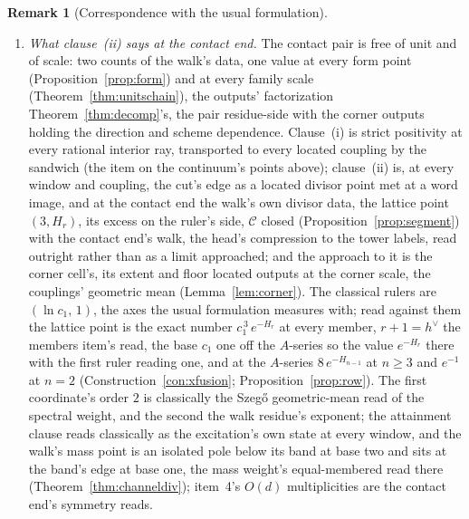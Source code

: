 \documentclass[11pt]{article}
\theoremstyle{definition}
\newtheorem{remark}{Remark}
\begin{document}
\begin{remark}[Correspondence with the usual formulation]
\begin{enumerate}[leftmargin=2em,itemsep=3pt]
\item \emph{What clause~(ii) says at the contact end.} The contact
pair is free of unit and of scale: two counts of the walk's data,
one value at every form point (Proposition~\ref{prop:form}) and at
every family scale (Theorem~\ref{thm:unitschain}), the outputs'
factorization Theorem~\ref{thm:decomp}'s, the pair
residue-side with the corner outputs holding the direction and
scheme dependence. Clause~(i) is strict positivity at
every rational interior ray, transported to every located coupling by the
sandwich (the item on the continuum's points above); clause~(ii) is, at every
window and coupling, the cut's edge as a located divisor point met
at a word image, and at the contact end the walk's own divisor
data, the lattice point $(3,H_r)$, its excess on the ruler's side,
$\mathcal C$ closed (Proposition~\ref{prop:segment}) with the
contact end's walk, the head's compression to the tower labels,
read outright rather than as a limit approached; and the approach to it is the corner cell's, its extent
and floor located outputs at the corner scale, the couplings'
geometric mean (Lemma~\ref{lem:corner}). The classical rulers are
$(\ln c_1,\,1)$, the axes the usual formulation measures with; read
against them the lattice point is the exact number
$c_1^{\,3}\,e^{-H_r}$ at every member, $r+1=h^\vee$
the members item's read, the
base $c_1$ one off the $A$-series so the value
$e^{-H_r}$ there with the first ruler reading one, and
at the $A$-series $8\,e^{-H_{n-1}}$
at $n\ge3$ and $e^{-1}$ at $n=2$
(Construction~\ref{con:xfusion}; Proposition~\ref{prop:row}). The first
coordinate's order $2$ is classically the Szeg\H o geometric-mean read of
the spectral weight, and the second the walk residue's exponent;
the attainment clause reads classically as the excitation's own
state at every window, and the walk's mass point is an isolated
pole below its band at base two and sits at the band's edge at base
one, the mass weight's equal-membered read there
(Theorem~\ref{thm:channeldiv});
item~4's $O(d)$ multiplicities are the contact end's symmetry reads.


\end{enumerate}
\end{remark}
\end{document}
